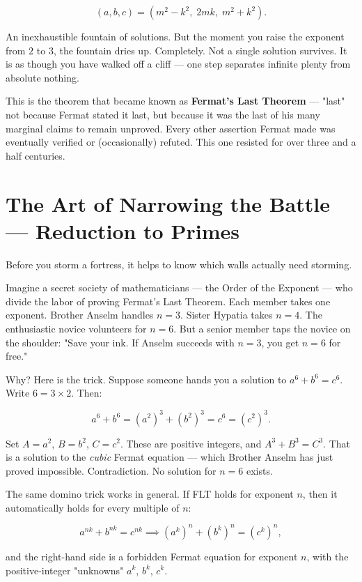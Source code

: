 \[
(a, b, c) = (m^2 - k^2,\; 2mk,\; m^2 + k^2).
\]

An inexhaustible fountain of solutions. But the moment you raise the exponent from $2$ to $3$, the fountain dries up. Completely. Not a single solution survives. It is as though you have walked off a cliff --- one step separates infinite plenty from absolute nothing.

This is the theorem that became known as \textbf{Fermat's Last Theorem} --- "last" not because Fermat stated it last, but because it was the last of his many marginal claims to remain unproved. Every other assertion Fermat made was eventually verified or (occasionally) refuted. This one resisted for over three and a half centuries.


\bigskip


\section{The Art of Narrowing the Battle --- Reduction to Primes}

Before you storm a fortress, it helps to know which walls actually need storming.

Imagine a secret society of mathematicians --- the Order of the Exponent --- who divide the labor of proving Fermat's Last Theorem. Each member takes one exponent. Brother Anselm handles $n = 3$. Sister Hypatia takes $n = 4$. The enthusiastic novice volunteers for $n = 6$. But a senior member taps the novice on the shoulder: "Save your ink. If Anselm succeeds with $n = 3$, you get $n = 6$ for free."

Why? Here is the trick. Suppose someone hands you a solution to $a^6 + b^6 = c^6$. Write $6 = 3 \times 2$. Then:

\[
a^6 + b^6 = (a^2)^3 + (b^2)^3 = c^6 = (c^2)^3.
\]

Set $A = a^2$, $B = b^2$, $C = c^2$. These are positive integers, and $A^3 + B^3 = C^3$. That is a solution to the \textit{cubic} Fermat equation --- which Brother Anselm has just proved impossible. Contradiction. No solution for $n = 6$ exists.

The same domino trick works in general. If FLT holds for exponent $n$, then it automatically holds for every multiple of $n$:

\[
a^{nk} + b^{nk} = c^{nk} \implies (a^k)^n + (b^k)^n = (c^k)^n,
\]

and the right-hand side is a forbidden Fermat equation for exponent $n$, with the positive-integer "unknowns" $a^k$, $b^k$, $c^k$.

